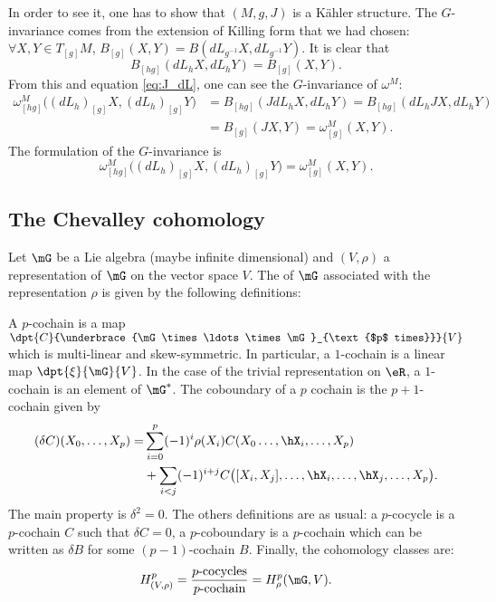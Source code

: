 In order to see it, one has to show that $(M,g,J)$ is  a Kähler structure. The $G$-invariance comes from the extension of Killing form that we had chosen: $\forall X,Y\in T_{[g]}M$, $B_{[g]}(X,Y)=B(dL_{g^{-1}}X,dL_{g^{-1}}Y)$.
It is clear that 
\begin{equation}
B_{[hg]}(dL_hX,dL_hY)=B_{[g]}(X,Y).
\end{equation}
From this and equation \eqref{eq:J_dL}, one can see the $G$-invariance of $\omega^M$:
\begin{equation}
\begin{split}
   \omega^M_{[hg]}\big((dL_h)_{[g]}X, (dL_h)_{[g]}Y\big)&=B_{[hg]}(JdL_hX,dL_hY)
                                                =B_{[hg]}(dL_h J X,dL_hY)\\
						&=B_{[g]}(JX,Y)
						=\omega^M_{[g]}(X,Y).   
\end{split}
\end{equation}
The formulation of the $G$-invariance is
\begin{equation}
   \omega^M_{[hg]}\Big( (dL_h)_{[g]}X, (dL_h)_{[g]}Y \Big)=\omega^M_{[g]}(X,Y).
\end{equation}

\subsection{The Chevalley cohomology}

Let $\mG$ be a Lie algebra (maybe infinite dimensional) and $(V,\rho)$ a representation of $\mG$ on the vector space $V$. The  of $\mG$ associated with the representation $\rho$ is given by the following definitions:

A $p$-cochain is a map $\dpt{C}{\underbrace{\mG\times\ldots\times\mG}_{\text{$p$ times}}}{V}$ which is multi-linear and skew-symmetric. In particular, a $1$-cochain is a linear map $\dpt{\xi}{\mG}{V}$. In the case of the trivial representation on $\eR$, a $1$-cochain is an element of $\mG^*$. The coboundary of a $p$ cochain is the $p+1$-cochain given by
\begin{equation}
\begin{split}
(\delta C)(X_0,\ldots,X_p)=&\sum_{i=0}^{p}(-1)^i\rho(X_i)C(X_0\ldots,\hX_i,\ldots,X_p)\\
                           &+\sum_{i<j}(-1)^{i+j}C\big(  [X_i,X_j],\ldots,\hX_i,\ldots,\hX_j,\ldots,X_p \big).
\end{split}
\end{equation}
The main property is $\delta^2=0$. The others definitions are as usual: a $p$-cocycle is a $p$-cochain $C$ such that $\delta C=0$, a $p$-coboundary is a $p$-cochain which can be written as $\delta B$ for some  $(p-1)$-cochain $B$. Finally, the cohomology classes are:
\begin{equation}
H^{p}_{(V,\rho)}=\frac{\text{$p$-cocycles}}{\text{$p$-cochain}}=H^p_{\rho}(\mG,V).
\end{equation}

